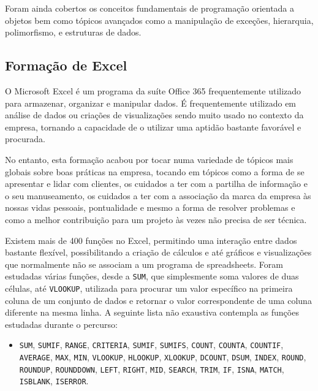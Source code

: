       Foram ainda cobertos os conceitos fundamentais de programação orientada a objetos bem como tópicos avançados como a manipulação de exceções, hierarquia, polimorfismo, e estruturas de dados. 

    \subsection{Formação de Excel}\label{subsec:excel}

      O Microsoft Excel é um programa da suíte Office 365 frequentemente utilizado para armazenar, organizar e manipular dados. É frequentemente utilizado em análise de dados ou criações de visualizações sendo muito usado no contexto da empresa, tornando a capacidade de o utilizar uma aptidão bastante favorável e procurada. 

      No entanto, esta formação acabou por tocar numa variedade de tópicos mais globais sobre boas práticas na empresa, tocando em tópicos como a forma de se apresentar e lidar com clientes, os cuidados a ter com a partilha de informação e o seu manuseamento, os cuidados a ter com a associação da marca da empresa às nossas vidas pessoais, pontualidade e mesmo a forma de resolver problemas e como a melhor contribuição para um projeto às vezes não precisa de ser técnica.

      Existem mais de 400 funções no Excel, permitindo uma interação entre dados bastante flexível, possibilitando a criação de cálculos e até gráficos e visualizações que normalmente não se associam a um programa de spreadsheets. Foram estudadas várias funções, desde a \texttt{SUM}, que simplesmente soma valores de duas células, até \texttt{VLOOKUP}, utilizada para procurar um valor específico na primeira coluna de um conjunto de dados e retornar o valor correspondente de uma coluna diferente na mesma linha. A seguinte lista não exaustiva contempla as funções estudadas durante o percurso:  

      \begin{itemize}
          \item \texttt{SUM}, \texttt{SUMIF}, \texttt{RANGE}, \texttt{CRITERIA}, \texttt{SUMIF}, \texttt{SUMIFS}, \texttt{COUNT}, \texttt{COUNTA}, \texttt{COUNTIF}, \texttt{AVERAGE}, \texttt{MAX}, \texttt{MIN}, \texttt{VLOOKUP}, \texttt{HLOOKUP}, \texttt{XLOOKUP}, \texttt{DCOUNT}, \texttt{DSUM}, \texttt{INDEX}, \texttt{ROUND}, \texttt{ROUNDUP}, \texttt{ROUNDDOWN}, \texttt{LEFT}, \texttt{RIGHT}, \texttt{MID}, \texttt{SEARCH}, \texttt{TRIM}, \texttt{IF}, \texttt{ISNA}, \texttt{MATCH}, \texttt{ISBLANK}, \texttt{ISERROR}.
      \end{itemize}    
    
